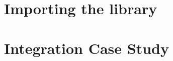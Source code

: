 \section{Importing the library}\label{sec:importing_the_library}


\section{Integration Case Study}\label{sec:integration_example}
